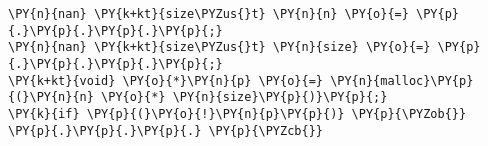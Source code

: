 \begin{Verbatim}[commandchars=\\\{\},codes={\catcode`\$=3\catcode`\^=7\catcode`\_=8}]
\PY{n}{nan} \PY{k+kt}{size\PYZus{}t} \PY{n}{n} \PY{o}{=} \PY{p}{.}\PY{p}{.}\PY{p}{.}\PY{p}{;}
\PY{n}{nan} \PY{k+kt}{size\PYZus{}t} \PY{n}{size} \PY{o}{=} \PY{p}{.}\PY{p}{.}\PY{p}{.}\PY{p}{;}
\PY{k+kt}{void} \PY{o}{*}\PY{n}{p} \PY{o}{=} \PY{n}{malloc}\PY{p}{(}\PY{n}{n} \PY{o}{*} \PY{n}{size}\PY{p}{)}\PY{p}{;}
\PY{k}{if} \PY{p}{(}\PY{o}{!}\PY{n}{p}\PY{p}{)} \PY{p}{\PYZob{}} \PY{p}{.}\PY{p}{.}\PY{p}{.} \PY{p}{\PYZcb{}}
\end{Verbatim}
